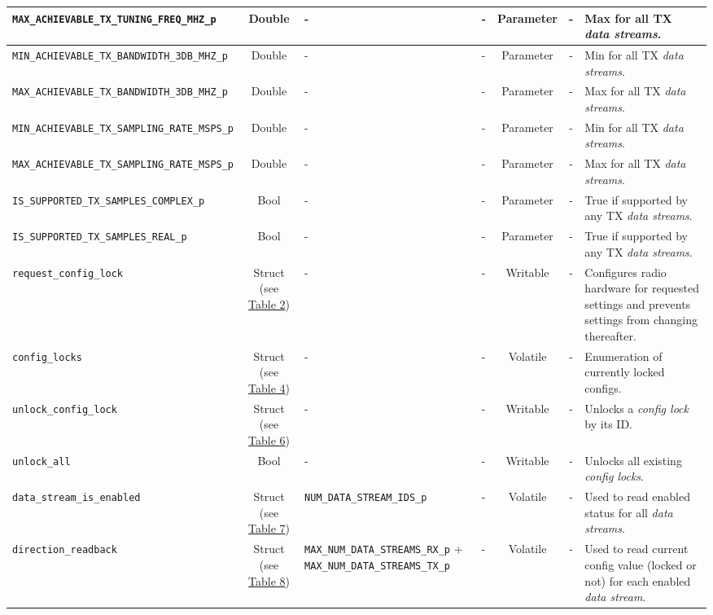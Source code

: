 \documentclass{article}
\begin{document}
\begin{landscape}
\begin{scriptsize}
\begin{longtable}{|p{5.3cm}|c|p{3.5cm}|p{3.5cm}|c|c|p{4.4cm}|}
			\hline
			\verb+MAX_ACHIEVABLE_TX_TUNING_FREQ_MHZ_p+        & Double & -        & - & Parameter           & -       & Max for all TX \textit{data streams}. \\
			\hline
			\verb+MIN_ACHIEVABLE_TX_BANDWIDTH_3DB_MHZ_p+      & Double & -        & - & Parameter           & -       & Min for all TX \textit{data streams}. \\
			\hline
			\verb+MAX_ACHIEVABLE_TX_BANDWIDTH_3DB_MHZ_p+      & Double & -        & - & Parameter           & -       & Max for all TX \textit{data streams}. \\
			\hline
			\verb+MIN_ACHIEVABLE_TX_SAMPLING_RATE_MSPS_p+      & Double & -        & - & Parameter           & -       & Min for all TX \textit{data streams}. \\
			\hline
			\verb+MAX_ACHIEVABLE_TX_SAMPLING_RATE_MSPS_p+      & Double & -        & - & Parameter           & -       & Max for all TX \textit{data streams}. \\
			\hline
			\verb+IS_SUPPORTED_TX_SAMPLES_COMPLEX_p+           & Bool   & -        & - & Parameter           & -       & True if supported by any TX \textit{data streams}. \\
			\hline
			\verb+IS_SUPPORTED_TX_SAMPLES_REAL_p+              & Bool   & -        & - & Parameter           & -       & True if supported by any TX \textit{data streams}. \\
			\hline
			\verb+request_config_lock+          & Struct (see \hyperlink{tab2}{Table 2}) & - & -       & Writable    & -       & Configures radio hardware for requested settings and prevents settings from changing thereafter. \\
			\hline
			\verb+config_locks+                 & Struct (see \hyperlink{tab4}{Table 4}) & - & -       & Volatile & -       & Enumeration of currently locked configs. \\
			\hline
			\verb+unlock_config_lock+           & Struct (see \hyperlink{tab6}{Table 6}) & - & -       & Writable    & -       & Unlocks a \textit{config lock} by its ID. \\
			\hline
			\verb+unlock_all+                   & Bool & - & -       & Writable    & -       & Unlocks all existing \textit{config locks}. \\
			\hline
			\verb+data_stream_is_enabled+       & Struct (see \hyperlink{tab7}{Table 7}) & \verb+NUM_DATA_STREAM_IDS_p+ & - & Volatile    & -       & Used to read enabled status for all \textit{data streams}. \\
			\hline
			\verb+direction_readback+              & Struct (see \hyperlink{tab8}{Table 8}) & \verb+MAX_NUM_DATA_STREAMS_RX_p+ + \verb+MAX_NUM_DATA_STREAMS_TX_p+ & - &Volatile    & -       & Used to read current config value (locked or not) for each enabled \textit{data stream}. \\

\end{longtable}
\end{scriptsize}
\end{landscape}
\end{document}
